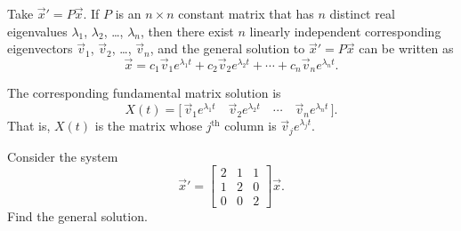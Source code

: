\begin{theorem1}{}
Take ${\vec{x}}' = P\vec{x}$.  If $P$ is an $n \times n$ constant matrix
that
has $n$ distinct real eigenvalues $\lambda_1$, $\lambda_2$, \ldots, $\lambda_n$,
then there exist $n$ linearly independent corresponding eigenvectors
$\vec{v}_1$, $\vec{v}_2$, \ldots, $\vec{v}_n$, and the general solution to
${\vec{x}}' = P\vec{x}$
can be written as
\begin{equation*}
\vec{x} = c_1 \vec{v}_1 e^{\lambda_1 t} +
c_2 \vec{v}_2 e^{\lambda_2 t} + \cdots +
c_n \vec{v}_n e^{\lambda_n t} .
\end{equation*}
\end{theorem1}

The corresponding fundamental matrix solution is
\begin{equation*}
X(t) = \bigl[\, \vec{v}_1 e^{\lambda_1 t} \quad \vec{v}_2 e^{\lambda_2 t}
\quad \cdots \quad \vec{v}_n e^{\lambda_n t} \,\bigr].
\end{equation*}
That is, $X(t)$
is the matrix whose $j^{\text{th}}$ column is 
$\vec{v}_j e^{\lambda_j t}$.

\begin{example}
Consider the system
\begin{equation*}
{\vec{x}}'
=
\begin{bmatrix}
2 & 1 & 1 \\
1 & 2 & 0 \\
0 & 0 & 2
\end{bmatrix}
\vec{x} .
\end{equation*}
Find the general solution.
\end{example}

